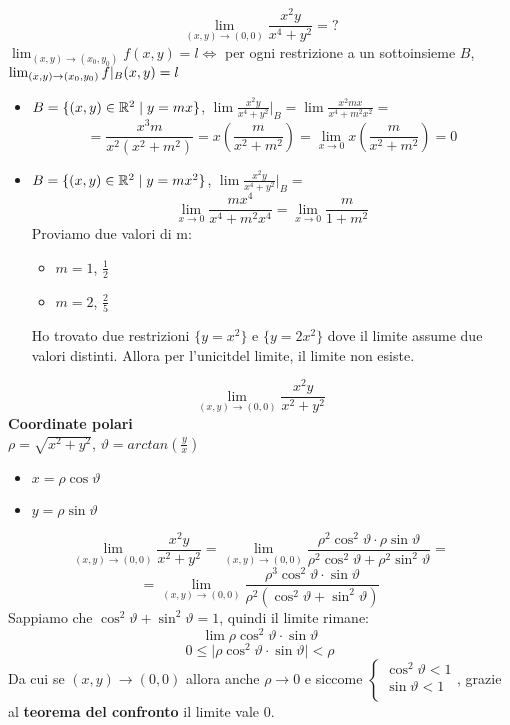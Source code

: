 \begin{eexercise}
  $$\lim_{(x,y)\to(0,0)} \frac{x^2y}{x^4+y^2}=?$$
  $\lim_{(x,y)\to(x_0,y_0)} f(x,y) = l \iff$ per ogni restrizione a un sottoinsieme $B$, $\lim_{(x,y)\to(x_0,y_0)} f\lvert_{B}(x,y) = l$
  \begin{itemize}
    \item $B=\{(x,y)\in\mathbb{R}^2\mid y = mx\}$, $\lim \frac{x^2y}{x^4+y^2} \lvert_{B} = \lim \frac{x^2mx}{x^4 + m^2x^2} = $
    $$= \frac{x^3m}{x^2(x^2+m^2)} = x\left(\frac{m}{x^2+m^2}\right) = \lim_{x\to 0} x\left(\frac{m}{x^2+m^2}\right) = 0$$
    \item $B=\{(x,y)\in\mathbb{R}^2\mid y = mx^2\}$, $\lim \frac{x^2y}{x^4+y^2} \lvert_{B} = $
    $$\lim_{x\to 0} \frac{mx^4}{x^4+m^2x^4} = \lim_{x \to 0} \frac{m}{1+m^2}$$
    Proviamo due valori di m:
    \begin{itemize}
      \item $m = 1$, $\frac{1}{2}$
      \item $m=2$, $\frac{2}{5}$
    \end{itemize} 
    Ho trovato due restrizioni $\{y = x^2\}$ e $\{y = 2x^2\}$ dove il limite assume due valori distinti. 
    Allora per l'unicit\aca del limite, il limite non esiste.
  \end{itemize}
\end{eexercise}
\begin{eexercise}
  $$\lim_{(x,y) \to (0,0)} \frac{x^2y}{x^2+y^2}$$
  \textbf{Coordinate polari}\\
  $\rho = \sqrt{x^2+y^2}$, $\vartheta = arctan\left(\frac{y}{x}\right)$
  \begin{itemize}
    \item $x = \rho \cos \vartheta$
    \item $y = \rho \sin \vartheta$
  \end{itemize}
  $$\lim_{(x,y) \to (0,0)} \frac{x^2y}{x^2+y^2} = \lim_{(x,y)\to (0,0)} \frac{\rho^2 \cos^2 \vartheta \cdot \rho \sin\vartheta}
  {\rho^2 \cos^2 \vartheta + \rho^2 \sin^2 \vartheta} = $$
  $$= \lim_{(x,y)\to (0,0)} \frac{\rho^3 \cos^2 \vartheta \cdot \sin \vartheta}{\rho^2 \left(\cos^2 \vartheta + \sin^2 \vartheta\right)}$$
  Sappiamo che $\cos^2 \vartheta + \sin^2 \vartheta = 1$, quindi il limite rimane:
  $$\lim \rho \cos^2 \vartheta \cdot \sin \vartheta$$
  $$0 \leq \lvert \rho \cos^2 \vartheta \cdot \sin \vartheta \rvert < \rho$$
  Da cui se $(x,y) \to (0,0)$ allora anche $\rho \to 0$ e siccome $\left\{\begin{array}{c}
    \cos^2 \vartheta < 1\\
    \sin \vartheta < 1 \\
  \end{array}\right.$, grazie al 
  \textbf{teorema del confronto} il limite vale 0.
\end{eexercise}
